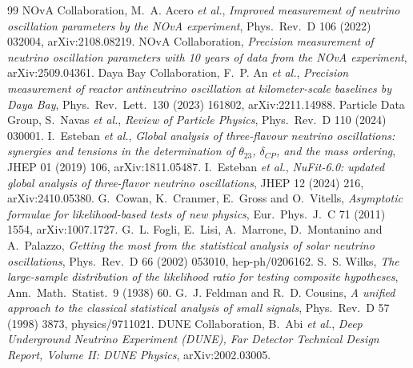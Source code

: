 \documentclass[11pt,a4paper]{article}
\begin{document}
\begin{thebibliography}{99}
 NOvA Collaboration, M.~A. Acero \emph{et al.}, \emph{Improved measurement of neutrino oscillation parameters by the NOvA experiment}, Phys.\ Rev.\ D 106 (2022) 032004, arXiv:2108.08219.
 NOvA Collaboration, \emph{Precision measurement of neutrino oscillation parameters with 10 years of data from the NOvA experiment}, arXiv:2509.04361.
 Daya Bay Collaboration, F.~P. An \emph{et al.}, \emph{Precision measurement of reactor antineutrino oscillation at kilometer-scale baselines by Daya Bay}, Phys.\ Rev.\ Lett.\ 130 (2023) 161802, arXiv:2211.14988.
 Particle Data Group, S.~Navas \emph{et al.}, \emph{Review of Particle Physics}, Phys.\ Rev.\ D 110 (2024) 030001.
 I.~Esteban \emph{et al.}, \emph{Global analysis of three-flavour neutrino oscillations: synergies and tensions in the determination of $\theta_{23}$, $\delta_{CP}$, and the mass ordering}, JHEP 01 (2019) 106, arXiv:1811.05487.
 I.~Esteban \emph{et al.}, \emph{NuFit-6.0: updated global analysis of three-flavor neutrino oscillations}, JHEP 12 (2024) 216, arXiv:2410.05380.
 G.~Cowan, K.~Cranmer, E.~Gross and O.~Vitells, \emph{Asymptotic formulae for likelihood-based tests of new physics}, Eur.\ Phys.\ J.\ C 71 (2011) 1554, arXiv:1007.1727.
 G.~L. Fogli, E.~Lisi, A.~Marrone, D.~Montanino and A.~Palazzo, \emph{Getting the most from the statistical analysis of solar neutrino oscillations}, Phys.\ Rev.\ D 66 (2002) 053010, hep-ph/0206162.
 S.~S. Wilks, \emph{The large-sample distribution of the likelihood ratio for testing composite hypotheses}, Ann.\ Math.\ Statist.\ 9 (1938) 60.
 G.~J. Feldman and R.~D. Cousins, \emph{A unified approach to the classical statistical analysis of small signals}, Phys.\ Rev.\ D 57 (1998) 3873, physics/9711021.
 DUNE Collaboration, B.~Abi \emph{et al.}, \emph{Deep Underground Neutrino Experiment (DUNE), Far Detector Technical Design Report, Volume II: DUNE Physics}, arXiv:2002.03005.
\end{thebibliography}
\end{document}
